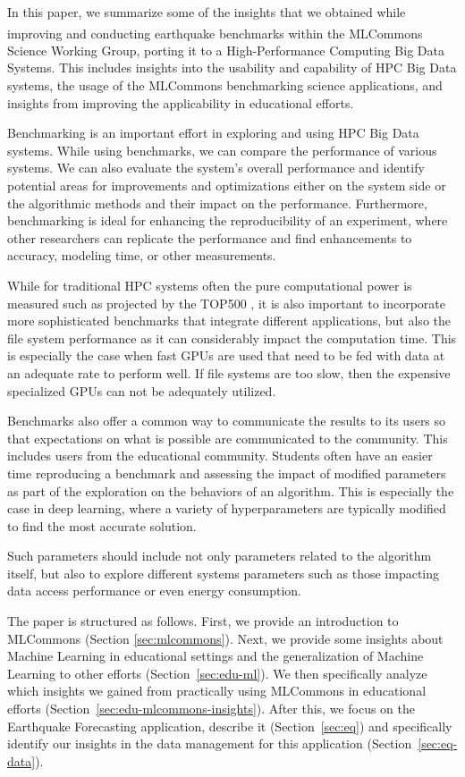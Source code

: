 \documentclass[utf8]{FrontiersinVancouver} %
\begin{document}
In this paper, we summarize some of the insights that we obtained while improving and conducting 
 earthquake benchmarks within the MLCommons\textsuperscript{\texttrademark} Science Working Group,  porting it to 
a High-Performance Computing Big Data Systems.
 This includes insights into the usability and capability of HPC Big Data
systems, the usage of the MLCommons benchmarking science
applications\citep{las-22-mlcommons-science}, and insights from improving the
applicability in educational efforts.

Benchmarking is an important effort in exploring and using HPC Big Data systems.
While using benchmarks, we can compare the performance of various
systems. We can also evaluate the system's overall performance
and identify potential areas for improvements and optimizations either
on the system side or the algorithmic methods and their impact on the
performance. Furthermore, benchmarking is ideal for enhancing the
reproducibility of an experiment, where other researchers can
replicate the performance and find enhancements to accuracy, modeling
time, or other measurements.

While for traditional HPC systems often the pure computational power
is measured such as projected by the TOP500
\cite{dongarra1997top500,www-top500}, it is also important to
incorporate more sophisticated benchmarks that integrate different
applications, but also the file system performance as it can
considerably impact the computation time. This is especially the case
when fast GPUs are used that need to be fed with data at an adequate
rate to perform well. If file systems are too slow, then the expensive
specialized GPUs can not be adequately utilized.

Benchmarks also offer a common way to communicate the results to its
users so that expectations on what is possible are communicated to the
community. This includes users from the educational
community. Students often have an easier time reproducing a benchmark
and assessing the impact of modified parameters as part of the exploration on the behaviors of an algorithm. This is especially the case in
deep learning, where a variety of hyperparameters are typically
modified to find the most accurate solution.

Such parameters should include not only parameters related to the
algorithm itself, but also to explore different systems parameters
such as those impacting data access performance or even energy
consumption.

The paper is structured as follows. First, we provide an introduction
to MLCommons (Section \ref{sec:mlcommons}).  Next, we provide some
insights about Machine Learning in educational settings and the
generalization of Machine Learning to other efforts (Section~\ref{sec:edu-ml}). We
then specifically analyze which insights we gained from practically
using MLCommons in educational efforts
(Section~\ref{sec:edu-mlcommons-insights}). After this, we focus on
the Earthquake Forecasting application, describe it
(Section~\ref{sec:eq}) and specifically identify our insights in the
data management for this application (Section~\ref{sec:eq-data}).
\end{document}
